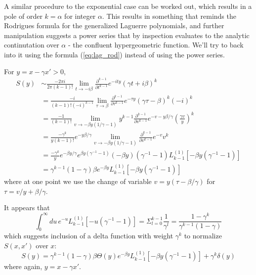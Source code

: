 \documentclass{article}
\begin{document}
A similar procedure to the exponential case can be worked out, which results in
a pole of order $k = \alpha$ for integer $\alpha$. This results in something
that reminds the Rodrigues formula for the generalized Laguerre polynomials,
and further manipulation suggests a power series that by inspection evaluates
to the analytic continutation over $\alpha$ - the confluent hypergeometric
function. We'll try to back into it using the formula (\ref{eq:lag_rod})
instead of using the power series.

For $y = x - \gamma x' > 0$,
\begin{align}
	S(y) & \sim \frac{-2\pi i}{2\pi(k-1)!} \lim_{t \rightarrow -i\beta} \frac{\partial^{k-1}}{\partial t ^{k-1}} e^{-ity} (\gamma t + i \beta)^k                                      \\
	     & = \frac{-i}{(k-1)! (-i)^{k-1}} \lim_{\tau \rightarrow \beta} \frac{\partial^{k-1}}{\partial \tau^{k-1}} e^{-\tau y} (\gamma \tau - \beta)^k (-i)^k                         \\
	     & = \frac{-1}{(k-1)!}  \lim_{v \rightarrow -\beta y(1/\gamma - 1)} y^{k-1} \frac{\partial^{k-1}}{\partial v ^{k-1}} e^{-v - y\beta/\gamma} \left(\frac{\gamma v}{y}\right)^k \\
	     & = \frac{-\gamma^k}{y (k-1)!} e^{-y\beta/\gamma} \lim_{v \rightarrow -\beta y(1/\gamma - 1)} \frac{\partial^{k-1}}{\partial v ^{k-1}} e^{-v} v^k                            \\
	     & = \frac{-\gamma^k}{y} e^{-\beta y/\gamma} e^{\beta y(\gamma^{-1}-1)} (-\beta y)(\gamma^{-1} - 1) L_{k-1}^{(1)}\left[-\beta y(\gamma^{-1}-1)\right]                         \\
	     & = \gamma^{k-1}(1 - \gamma) \beta e^{-\beta y} L_{k-1}^{(1)}\left[-\beta y(\gamma^{-1}-1)\right]
\end{align}
where at one point we use the change of variable $v = y(\tau - \beta/\gamma)$ for $\tau = v/y + \beta/\gamma$.

It appears that
\begin{equation}
	\int_0^\infty du\, e^{-u} L_{k-1}^{(1)}[-u(\gamma^{-1} - 1)] = \Sigma_{l=0}^{k-1} \frac{1}{\gamma^l} = \frac{1-\gamma^k}{\gamma^{k-1}(1-\gamma)}
\end{equation}
which suggests inclusion of a delta function with weight $\gamma^k$ to normalize $S(x, x')$ over $x$:
\begin{equation}
	S(y) = \gamma^{k-1}(1 - \gamma) \beta \Theta(y) e^{-\beta y} L_{k-1}^{(1)}\left[-\beta y(\gamma^{-1}-1)\right] + \gamma^k \delta(y)
\end{equation}
where again, $y = x - \gamma x'$.
\end{document}
